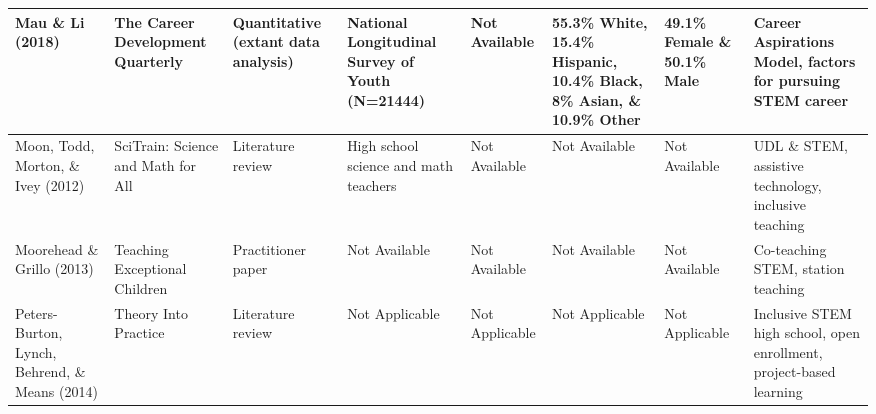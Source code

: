 \documentclass[11.5pt]{sig-alternate}
\begin{document}
\begin{@twocolumnfalse}
\begin{table}
\begin{tabular}{m{0.72in}m{0.72in}m{0.72in}m{0.72in}m{0.72in}m{0.72in}m{0.72in}m{0.72in}}
Mau \&  Li (2018)                                    & The Career Development Quarterly                                & Quantitative (extant data analysis)   & National Longitudinal Survey of Youth (N=21444)                                              &  \centering Not Available                                     & 55.3\% White, 15.4\% Hispanic, 10.4\% Black, 8\% Asian, \& 10.9\% Other                                & 49.1\% Female \& 50.1\% Male                                     & Career Aspirations Model, factors for pursuing STEM career                                               \\ \hline
Moon, Todd, Morton, \&  Ivey (2012)                  & SciTrain: Science and Math for All                              & Literature review                     & High school science and math teachers                                                        &  \centering Not Available                                     &  \centering Not Available                                                                                          &  \centering Not Available                                                    & UDL \& STEM, assistive technology, inclusive teaching                                                    \\ \hline
Moorehead \&    Grillo (2013)                  & Teaching Exceptional Children                                   & Practitioner paper                    &  \centering Not Available                                                                                &  \centering Not Available                                     &  \centering Not Available                                                                                          &  \centering Not Available                                                    & Co-teaching STEM, station teaching                                                                       \\ \hline
Peters-Burton, Lynch, Behrend, \&   Means (2014)  & Theory Into Practice                                            & Literature review                     &  \centering Not Applicable                                                                               &  \centering Not Applicable                                    &  \centering Not Applicable                                                                                         &  \centering Not Applicable                                                   & Inclusive STEM high school, open enrollment, project-based learning                                      \\ \hline

\end{tabular}
\end{table}
\end{@twocolumnfalse}
\end{document}
